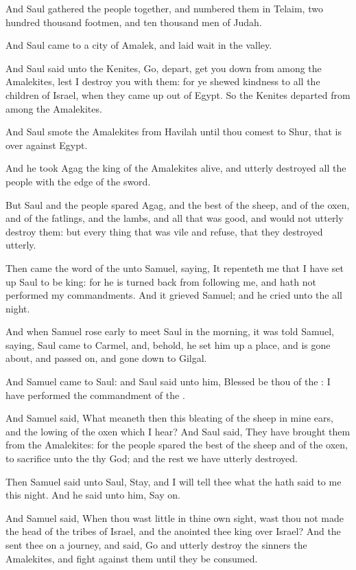 \Verse And Saul gathered the people together, and numbered them in Telaim, two hundred thousand footmen, and ten thousand men of Judah.

\Verse And Saul came to a city of Amalek, and laid wait in the valley.

\Verse And Saul said unto the Kenites, Go, depart, get you down from among the Amalekites, lest I destroy you with them: for ye shewed kindness to all the children of Israel, when they came up out of Egypt. So the Kenites departed from among the Amalekites.

\Verse And Saul smote the Amalekites from Havilah until thou comest to Shur, that is over against Egypt.

\Verse And he took Agag the king of the Amalekites alive, and utterly destroyed all the people with the edge of the sword.

\Verse But Saul and the people spared Agag, and the best of the sheep, and of the oxen, and of the fatlings, and the lambs, and all that was good, and would not utterly destroy them: but every thing that was vile and refuse, that they destroyed utterly.

\Verse Then came the word of the \LORD unto Samuel, saying, \Verse It repenteth me that I have set up Saul to be king: for he is turned back from following me, and hath not performed my commandments. And it grieved Samuel; and he cried unto the \LORD all night.

\Verse And when Samuel rose early to meet Saul in the morning, it was told Samuel, saying, Saul came to Carmel, and, behold, he set him up a place, and is gone about, and passed on, and gone down to Gilgal.

\Verse And Samuel came to Saul: and Saul said unto him, Blessed be thou of the \LORD: I have performed the commandment of the \LORD.

\Verse And Samuel said, What meaneth then this bleating of the sheep in mine ears, and the lowing of the oxen which I hear?  \Verse And Saul said, They have brought them from the Amalekites: for the people spared the best of the sheep and of the oxen, to sacrifice unto the \LORD thy God; and the rest we have utterly destroyed.

\Verse Then Samuel said unto Saul, Stay, and I will tell thee what the \LORD hath said to me this night. And he said unto him, Say on.

\Verse And Samuel said, When thou wast little in thine own sight, wast thou not made the head of the tribes of Israel, and the \LORD anointed thee king over Israel?  \Verse And the \LORD sent thee on a journey, and said, Go and utterly destroy the sinners the Amalekites, and fight against them until they be consumed.

